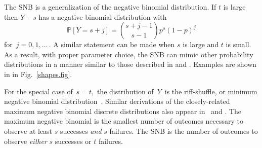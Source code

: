 \documentclass[review]{elsarticle}
\begin{document}
The SNB is a generalization of the negative 
binomial distribution. If $t$ is large then $Y-s$ has a 
negative binomial distribution with
\begin{equation*}                                    %
\mathbb{P}[Y=s+j]        \label{nb1.eq}          
  = {{s+j-1}\choose{s-1}} p^s (1-p)^j
\end{equation*}
for $\,j=0, 1,\ldots\,$. A similar statement can be made when $s$ is large
and $t$ is small. As a result, with proper parameter choice, the SNB
can mimic other probability distributions in a manner similar to 
those described in \cite{Peizer1968} and \cite{Best1974}. Examples are
shown in in Fig.~\ref{shapes.fig}. 

For the special case of $\,s=t,$ the distribution of $\,Y\,$ is the
riff-shuffle, or minimum negative binomial distribution~\citep{Uppuluri1970}.
Similar derivations of the closely-related maximum negative binomial 
discrete distributions also appear in~\cite{Zhang2000}
and \cite{Zelterman2005}.
The maximum negative binomial is the smallest number of outcomes necessary to 
observe at least $s$ successes {\em and} $s$ failures. The SNB is the 
number of outcomes to observe {\em either} $s$ successes or $t$ failures.

\end{document}
